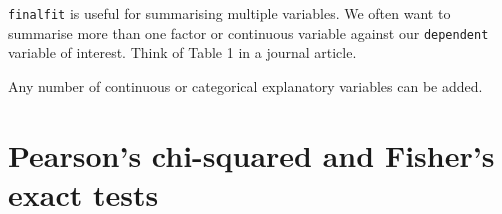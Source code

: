 \documentclass[
  12pt,
  krantz2]{krantz}
\makeatletter
\newenvironment{Shaded}{\begin{snugshade}}{\end{snugshade}}
\newcommand{\DataTypeTok}[1]{\textcolor[rgb]{0.13,0.29,0.53}{#1}}
\newcommand{\KeywordTok}[1]{\textcolor[rgb]{0.13,0.29,0.53}{\textbf{#1}}}
\newcommand{\NormalTok}[1]{#1}
\newcommand{\OperatorTok}[1]{\textcolor[rgb]{0.81,0.36,0.00}{\textbf{#1}}}
\newcommand{\StringTok}[1]{\textcolor[rgb]{0.31,0.60,0.02}{#1}}
\newenvironment{kframe}{%
\medskip{}
\setlength{\fboxsep}{.8em}
 \def\at@end@of@kframe{}%
 \ifinner\ifhmode%
  \def\at@end@of@kframe{\end{minipage}}%
  \begin{minipage}{\columnwidth}%
 \fi\fi%
 \def\FrameCommand##1{\hskip\@totalleftmargin \hskip-\fboxsep
 \colorbox{shadecolor}{##1}\hskip-\fboxsep
     \hskip-\linewidth \hskip-\@totalleftmargin \hskip\columnwidth}%
 \MakeFramed {\advance\hsize-\width
   \@totalleftmargin\z@ \linewidth\hsize
   \@setminipage}}%
 {\par\unskip\endMakeFramed%
 \at@end@of@kframe}
\renewenvironment{Shaded}{\begin{kframe}}{\end{kframe}}
\makeatother
\begin{document}
\texttt{finalfit} is useful for summarising multiple variables.
We often want to summarise more than one factor or continuous variable against our \texttt{dependent} variable of interest.
Think of Table 1 in a journal article.

Any number of continuous or categorical explanatory variables can be added.

\begin{Shaded}
\end{Shaded}

\begin{table}[!h]

\caption{\label{tab:unnamed-chunk-17}Multiple variables by outcome: Outcome after surgery for melanoma by patient and disease factors.}
\centering
{}
\end{table}

\hypertarget{pearsons-chi-squared-and-fishers-exact-tests}{%
\section{Pearson's chi-squared and Fisher's exact tests}\label{pearsons-chi-squared-and-fishers-exact-tests}}
\end{document}
